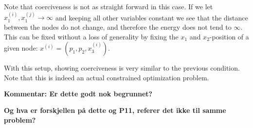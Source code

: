 Note that coerciveness is not as straight forward in this case. If we let $x_1^{(i)}, x_1^{(j)} \to \infty$ and keeping all other variables constant we see that the distance between the nodes do not change, and therefore the energy does not tend to $\infty$. This can be fixed without a loss of generality by fixing the $x_1$ and $x_2$-position of a given node: $x^{(i)} = (p_1,p_2,x^{(i)}_3)$.

With this setup, showing coerciveness is very similar to the previous condition. Note that this is indeed an actual constrained optimization problem. 

\textbf{Kommentar: Er dette godt nok begrunnet?}

\textbf{Og hva er forskjellen på dette og P11, referer det ikke til samme problem?}
